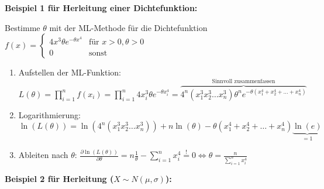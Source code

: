 \textbf{Beispiel 1 für Herleitung einer Dichtefunktion:}

Bestimme \(\theta\) mit der ML-Methode für die Dichtefunktion\\

\(f(x) = \begin{cases}
    4x^3\theta e^{-\theta x^4} & \text{für } x>0, \theta>0\\
    0 & \text{sonst}
\end{cases}\)\\

\begin{enumerate}
    \item Aufstellen der ML-Funktion: \(L(\theta)=\prod_{i=1}^{n}f(x_i)=\prod_{i=1}^{n}4x_i^3\theta e^{-\theta x_i^4}=\overbrace{4^n(x_1^3x_2^3\hdots x_n^3)\theta^n e^{-\theta(x_1^4+x_2^4+\hdots+x_n^4)}}^{\text{Sinnvoll zusammenfassen}}\)
    \item Logarithmierung: \(\ln(L(\theta))=\ln(4^n(x_1^3x_2^3\hdots x_n^3))+n\ln(\theta)-\theta(x_1^4+x_2^4+\hdots+x_n^4)\underbrace{\ln(e)}_{=1}\)
    \item Ableiten nach \(\theta\): \(\frac{\partial \ln(L(\theta))}{\partial \theta}=n\frac{1}{\theta}-\sum_{i=1}^{n}x_i^4\stackrel{!}{=}0\Leftrightarrow \theta=\frac{n}{\sum_{i=1}^{n}x_i^4}\)
\end{enumerate}



\textbf{Beispiel 2 für Herleitung (\(X\sim N(\mu, \sigma)\)):}

